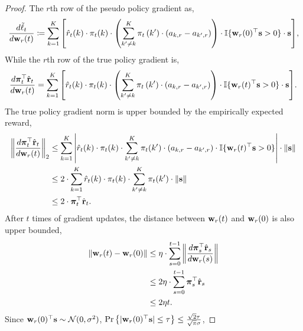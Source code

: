 \begin{proof}
The $r$th row of the pseudo policy gradient as,
\begin{equation*}
	\frac{d \tilde{\ell}_t}{d {\mathbf{w}}_r(t)} \coloneqq \sum\limits_{k=1}^{K}{ \left[ \hat{r}_{t}(k) \cdot \pi_{t}(k) \cdot \left( \sum\limits_{k^\prime \not= k}^{K}{ \pi_{t}\left(k^\prime\right) \cdot \left( a_{k,r} - a_{k^\prime,r} \right)  } \right) \cdot {\mathbb{I}}\{ {\mathbf{w}}_r(0)^\top {\mathbf{s}} > 0 \} \cdot {\mathbf{s}} \right] },
\end{equation*}
While the $r$th row of the true policy gradient is,
\begin{equation*}
	\frac{d {\boldsymbol{\pi}}_t^\top \hat{{\mathbf{r}}}_t}{d {\mathbf{w}}_r(t)} = \sum\limits_{k=1}^{K}{ \left[\hat{r}_{t}(k) \cdot \pi_{t}(k) \cdot \left( \sum\limits_{k^\prime \not= k}^{K}{ \pi_{t}\left(k^\prime\right) \cdot \left( a_{k,r} - a_{k^\prime,r} \right)  } \right) \cdot {\mathbb{I}}\{ {\mathbf{w}}_r(t)^\top {\mathbf{s}} > 0 \} \cdot {\mathbf{s}} \right] }.
\end{equation*}
The true policy gradient norm is upper bounded by the empirically expected reward,
\begin{equation*}
\begin{split}
	\left\| \frac{d {\boldsymbol{\pi}}_t^\top \hat{{\mathbf{r}}}_t}{d {\mathbf{w}}_r(t)} \right\|_2 &\le \sum\limits_{k=1}^{K}{ \left|\hat{r}_{t}(k) \cdot \pi_{t}(k) \cdot \sum\limits_{k^\prime \not= k}^{K}{ \pi_{t}(k^\prime) \cdot ( a_{k,r} - a_{k^\prime,r} )  } \cdot {\mathbb{I}}\{ {\mathbf{w}}_r(t)^\top {\mathbf{s}} > 0 \} \right| \cdot \| {\mathbf{s}} \| } \\
	&\le 2 \cdot \sum\limits_{k=1}^{K}{\hat{r}_{t}(k) \cdot \pi_{t}(k) \cdot \sum\limits_{k^\prime \not= k}^{K}{ \pi_{t}(k^\prime)  } \cdot \| {\mathbf{s}} \|  } \\
	&\le 2 \cdot {\boldsymbol{\pi}}_t^\top \hat{{\mathbf{r}}}_t.
\end{split}
\end{equation*}
After $t$ times of gradient updates, the distance between ${\mathbf{w}}_r(t)$ and ${\mathbf{w}}_r(0)$ is also upper bounded,
\begin{equation*}
\begin{split}
	\| {\mathbf{w}}_r(t) - {\mathbf{w}}_r(0) \| &\le \eta \cdot \sum\limits_{s=0}^{t-1}{\left\| \frac{d {\boldsymbol{\pi}}_s^\top \hat{{\mathbf{r}}}_s}{d {\mathbf{w}}_r(s)} \right\|} \\
	&\le 2 \eta \cdot \sum\limits_{s=0}^{t-1}{ {\boldsymbol{\pi}}_s^\top \hat{{\mathbf{r}}}_s } \\
	&\le 2 \eta t .
\end{split}
\end{equation*}
Since ${\mathbf{w}}_r(0)^\top {\mathbf{s}} \sim {\mathcal{N}}(0, \sigma^2)$, $\operatorname*{Pr}\left\{ | {\mathbf{w}}_r(0)^\top {\mathbf{s}} | \le \tau\right\} \le \frac{\sqrt{2}\tau}{\sqrt{\pi}\sigma}$,

\end{proof}
